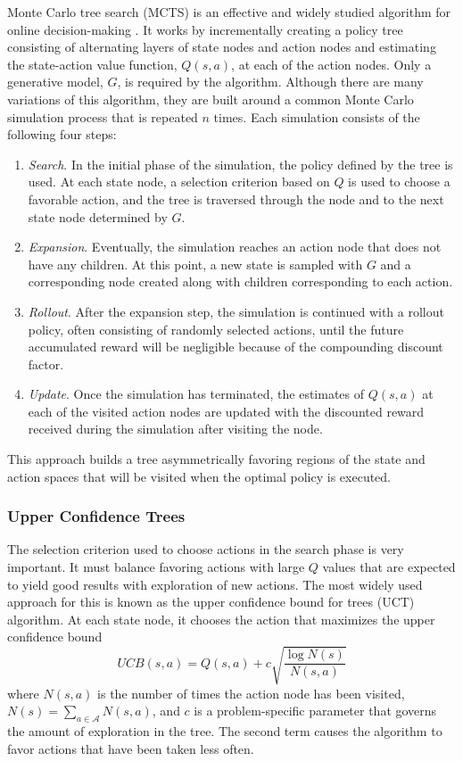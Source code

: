 Monte Carlo tree search (MCTS) is an effective and widely studied algorithm for online decision-making \cite{browne2012survey}.
It works by incrementally creating a policy tree consisting of alternating layers of state nodes and action nodes and estimating the state-action value function, $Q(s,a)$, at each of the action nodes.
Only a generative model, $G$, is required by the algorithm.
Although there are many variations of this algorithm, they are built around a common Monte Carlo simulation process that is repeated $n$ times.
Each simulation consists of the following four steps:
\begin{enumerate}
    \item \emph{Search}. In the initial phase of the simulation, the policy defined by the tree is used.
        At each state node, a selection criterion based on $Q$ is used to choose a favorable action, and the tree is traversed through the node and to the next state node determined by $G$.
    \item \emph{Expansion}. Eventually, the simulation reaches an action node that does not have any children.
        At this point, a new state is sampled with $G$ and a corresponding node created along with children corresponding to each action. 
    \item \emph{Rollout}. After the expansion step, the simulation is continued with a rollout policy, often consisting of randomly selected actions, until the future accumulated reward will be negligible because of the compounding discount factor.
    \item \emph{Update}. Once the simulation has terminated, the estimates of $Q(s,a)$ at each of the visited action nodes are updated with the discounted reward received during the simulation after visiting the node.
\end{enumerate}
This approach builds a tree asymmetrically favoring regions of the state and action spaces that will be visited when the optimal policy is executed.

\subsubsection{Upper Confidence Trees} \label{sec:uct}

The selection criterion used to choose actions in the search phase is very important.
It must balance favoring actions with large $Q$ values that are expected to yield good results with exploration of new actions.
The most widely used approach for this is known as the upper confidence bound for trees (UCT) algorithm.
At each state node, it chooses the action that maximizes the upper confidence bound
\begin{equation} \label{eqn:ucb}
    UCB(s,a) = Q(s,a) + c \sqrt{\frac{\log N(s)}{N(s,a)}}
\end{equation}
where $N(s,a)$ is the number of times the action node has been visited, $N(s) = \sum_{a \in \mathcal{A}} N(s,a)$, and $c$ is a problem-specific parameter that governs the amount of exploration in the tree.
The second term causes the algorithm to favor actions that have been taken less often.

